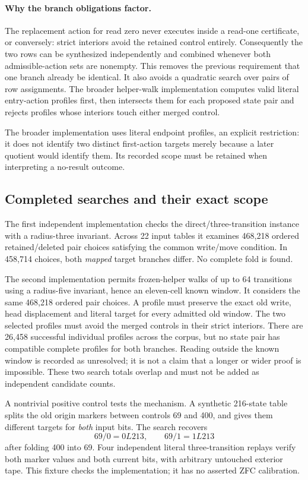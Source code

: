 \paragraph{Why the branch obligations factor.}
The replacement action for read zero never executes inside a read-one certificate, or conversely: strict interiors avoid the retained control entirely. Consequently the two rows can be synthesized independently and combined whenever both admissible-action sets are nonempty. This removes the previous requirement that one branch already be identical. It also avoids a quadratic search over pairs of row assignments. The broader helper-walk implementation computes valid literal entry-action profiles first, then intersects them for each proposed state pair and rejects profiles whose interiors touch either merged control.

The broader implementation uses literal endpoint profiles, an explicit restriction: it does not identify two distinct first-action targets merely because a later quotient would identify them. Its recorded scope must be retained when interpreting a no-result outcome.

\subsection{Completed searches and their exact scope}

The first independent implementation checks the direct/three-transition instance with a radius-three invariant. Across 22 input tables it examines 468,218 ordered retained/deleted pair choices satisfying the common write/move condition. In 458,714 choices, both \emph{mapped} target branches differ. No complete fold is found.

The second implementation permits frozen-helper walks of up to 64 transitions using a radius-five invariant, hence an eleven-cell known window. It considers the same 468,218 ordered pair choices. A profile must preserve the exact old write, head displacement and literal target for every admitted old window. The two selected profiles must avoid the merged controls in their strict interiors. There are 26,458 successful individual profiles across the corpus, but no state pair has compatible complete profiles for both branches. Reading outside the known window is recorded as unresolved; it is not a claim that a longer or wider proof is impossible. These two search totals overlap and must not be added as independent candidate counts.

A nontrivial positive control tests the mechanism. A synthetic 216-state table splits the old origin markers between controls 69 and 400, and gives them different targets for \emph{both} input bits. The search recovers
\[
 69/0=0L213,\qquad69/1=1L213
\]
after folding 400 into 69. Four independent literal three-transition replays verify both marker values and both current bits, with arbitrary untouched exterior tape. This fixture checks the implementation; it has no asserted ZFC calibration.

